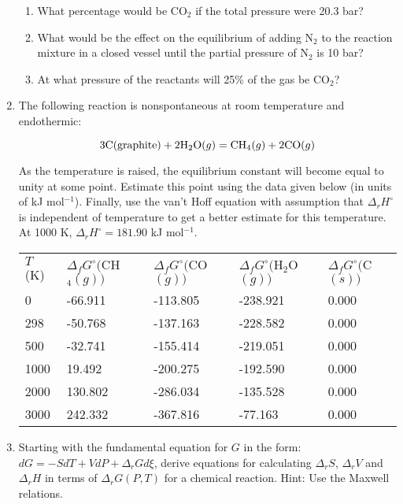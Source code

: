 \begin{enumerate}
\begin{enumerate}
\item What percentage would be CO$_2$ if the total pressure were 20.3 bar?
\item What would be the effect on the equilibrium of adding N$_2$ to the reaction mixture in a closed vessel until the partial pressure of N$_2$ is 10 bar?
\item At what pressure of the reactants will 25\% of the gas be CO$_2$?
\end{enumerate}


\item The following reaction is nonspontaneous at room temperature and endothermic:

$$3\textnormal{C}(\textnormal{graphite}) + 2\textnormal{H}_2\textnormal{O}(g) = \textnormal{CH}_4(g) + 2\textnormal{CO}(g)$$

As the temperature is raised, the equilibrium constant will become equal to unity at some point. Estimate this point using the data given below (in units of kJ mol$^{-1}$). Finally, use the van't Hoff equation with assumption that $\Delta_rH^\circ$ is independent of temperature to get a better estimate for this temperature.  At 1000 K, $\Delta_rH^\circ = 181.90$ kJ mol$^{-1}$.

\begin{tabular}{lllll}
$T$ (K) & $\Delta_fG^\circ($CH$_4(g))$ & $\Delta_fG^\circ($CO$(g))$ & $\Delta_fG^\circ($H$_2$O$(g))$ & $\Delta_fG^\circ($C$(s))$\\
0    & -66.911 & -113.805 & -238.921 & 0.000\\
298  & -50.768 & -137.163 & -228.582 & 0.000\\
500  & -32.741 & -155.414 & -219.051 & 0.000\\
1000 & 19.492  & -200.275 & -192.590 & 0.000\\
2000 & 130.802 & -286.034 & -135.528 & 0.000\\
3000 & 242.332 & -367.816 & -77.163  & 0.000\\
\end{tabular}


\item Starting with the fundamental equation for $G$ in the form: $dG = -SdT + VdP + \Delta_rGd\xi$, derive equations for calculating $\Delta_rS$, $\Delta_rV$ and $\Delta_rH$ in terms of $\Delta_rG(P,T)$ for a chemical reaction. Hint: Use the Maxwell relations.


\end{enumerate}
